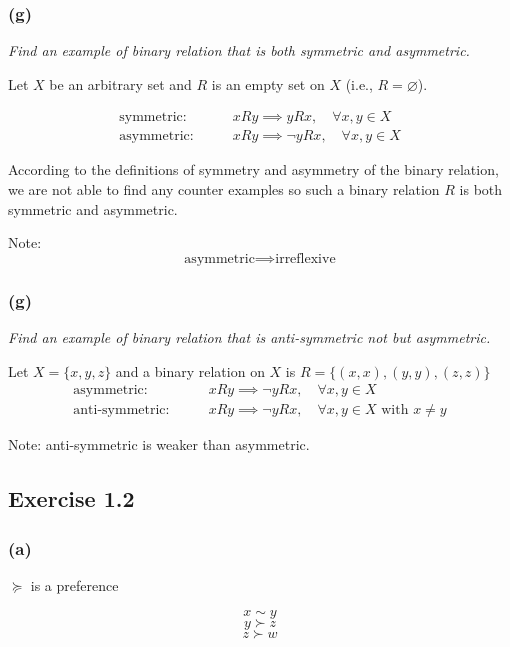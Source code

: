 \documentclass[a4paper]{article}
\begin{document}
\subsubsection*{(g)}

\textit{Find an example of binary relation that is both symmetric and asymmetric.}

Let $X$ be an arbitrary set and $R$ is an empty set on $X$ (i.e., $R=\varnothing$).

\begin{align*}
    \text{symmetric:} \qquad & xRy\implies yRx, \quad \forall x, y\in X \\
    \text{asymmetric:} \qquad & xRy\implies\neg yRx, \quad \forall x, y\in X
\end{align*}

According to the definitions of symmetry and asymmetry of the binary relation, we are not able to find any counter examples so such a binary relation $R$ is both symmetric and asymmetric.

Note:
\[\text{asymmetric} \implies \text{irreflexive} \]

\subsubsection*{(g)}

\textit{Find an example of binary relation that is anti-symmetric not but asymmetric.}

Let $X=\{x, y, z\}$ and a binary relation on $X$ is $R=\{(x,x), (y,y), (z,z) \}$
\begin{align*}
    \text{asymmetric:}\qquad & xRy \implies \neg yRx,\quad \forall x, y\in X \\
    \text{anti-symmetric:}\qquad & xRy \implies \neg yRx,\quad \forall x, y\in X \text{ with } x\neq y
\end{align*}

Note: anti-symmetric is weaker than asymmetric.

\subsection*{Exercise 1.2}

\subsubsection*{(a)}

$\succeq$ is a preference

\[x\sim y \]
\[y\succ z \]
\[z\succ w \]
\end{document}
